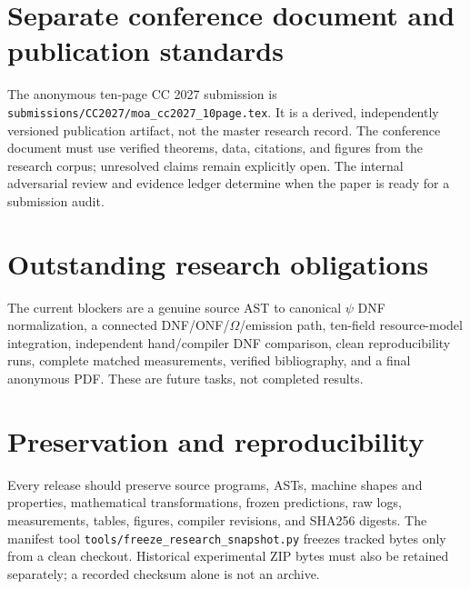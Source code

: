 \documentclass[11pt]{article}
\begin{document}
\section{Separate conference document and publication standards}
The anonymous ten-page CC 2027 submission is \texttt{submissions/CC2027/moa\_cc2027\_10page.tex}. It is a derived, independently versioned publication artifact, not the master research record. The conference document must use verified theorems, data, citations, and figures from the research corpus; unresolved claims remain explicitly open. The internal adversarial review and evidence ledger determine when the paper is ready for a submission audit.

\section{Outstanding research obligations}
The current blockers are a genuine source AST to canonical $\psi$ DNF normalization, a connected DNF/ONF/$\Omega$/emission path, ten-field resource-model integration, independent hand/compiler DNF comparison, clean reproducibility runs, complete matched measurements, verified bibliography, and a final anonymous PDF. These are future tasks, not completed results.

\section{Preservation and reproducibility}
Every release should preserve source programs, ASTs, machine shapes and properties, mathematical transformations, frozen predictions, raw logs, measurements, tables, figures, compiler revisions, and SHA256 digests. The manifest tool \texttt{tools/freeze\_research\_snapshot.py} freezes tracked bytes only from a clean checkout. Historical experimental ZIP bytes must also be retained separately; a recorded checksum alone is not an archive.
\end{document}
